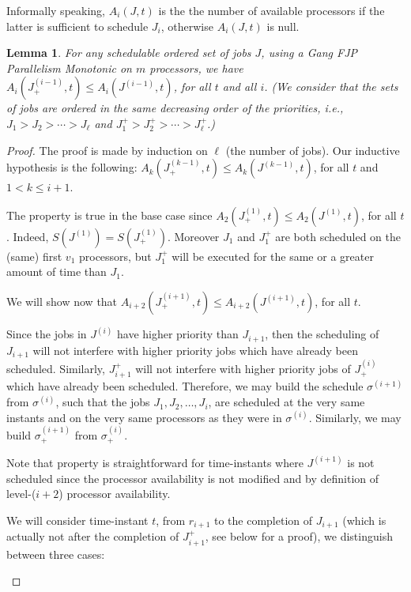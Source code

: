 \documentclass[a4paper]{article}
\newtheorem{lemma}[theorem]{Lemma}
\begin{document}
Informally speaking, $A_{i}(J,t)$ is the the number of available processors if the latter is sufficient to schedule $J_{i}$, otherwise $A_{i}(J,t)$ is null.  

\begin{lemma}\label{lem:AParMon} 
For any schedulable ordered set of jobs $J$, using a Gang FJP Parallelism Monotonic on $m$  processors, we have $A_{i}(J^{(i-1)}_{+},t) \leq A_{i}(J^{(i-1)},t)$, for all $t$ and all $i$. (We consider that the sets of jobs are ordered in the same decreasing order of the priorities, i.e., $J_1 > J_2 > \cdots > J_{\ell}$ and $J_1^{+} > J_2^{+} > \cdots > J_{\ell}^{+}$.)
\end{lemma}
\begin{proof}
  The proof is made by induction on $\ell$ (the number of jobs).  Our inductive hypothesis is the following: $A_{k}(J^{(k-1)}_{+},t) \leq A_{k}(J^{(k-1)},t)$, for all $t$ and $1 < k \leq i+1$.
 
  The property is true in the base case since $A_{2}(J^{(1)}_{+},t) \leq A_{2}(J^{(1)},t)$, for all $t$. Indeed, $S(J^{(1)}) = S(J^{(1)}_{+})$. Moreover $J_{1}$ and $J_{1}^{+}$ are both scheduled on the (same) first $v_{1}$ processors, but $J_{1}^{+}$ will be executed for the same or a greater amount of time than $J_{1}$.

  We will show now that $A_{i+2}(J^{(i+1)}_{+},t) \leq A_{i+2}(J^{(i+1)},t)$, for all $t$.

  Since the jobs in $J^{(i)}$ have higher priority than $J_{i+1}$, then the scheduling of $J_{i+1}$ will not interfere with higher priority jobs which have already been scheduled. Similarly, $J^{+}_{i+1}$ will not interfere with higher priority jobs of $J^{(i)}_{+}$ which have already been scheduled. Therefore, we may build the schedule $\sigma^{(i+1)}$ from $\sigma^{(i)}$, such that the jobs $J_1, J_2, \ldots, J_{i}$, are scheduled at the very same instants and on the very same processors as they were in $\sigma^{(i)}$. Similarly, we may build $\sigma^{(i+1)}_{+}$ from $\sigma^{(i)}_{+}$.

Note that property is straightforward for time-instants where $J^{(i+1)}$ is not scheduled since the processor availability is not modified and by definition of level-($i+2$) processor availability. 

We will consider time-instant $t$, from $r_{i+1}$ to the completion of $J_{i+1}$ (which is actually not after the completion of $J_{i+1}^{+}$, see below for a proof), we distinguish between three cases:
\begin{enumerate}


\end{enumerate}
\end{proof}
\end{document}
